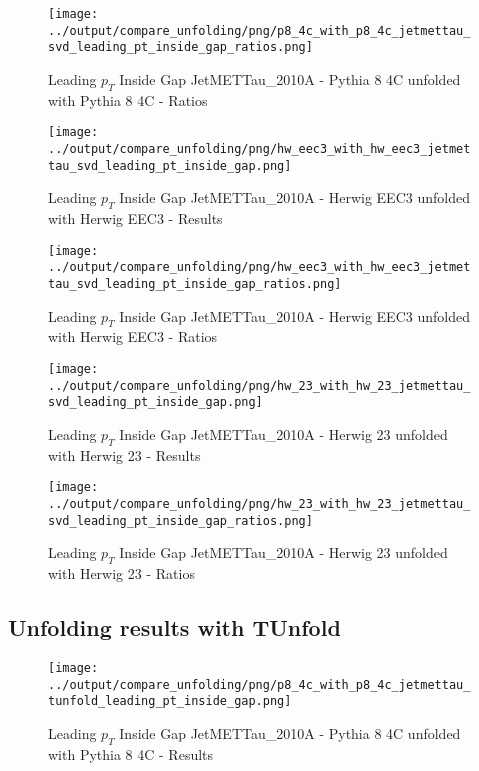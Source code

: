\documentclass[11pt]{book}
\begin{document}
\begin{figure}[ht]
\centering
\texttt{[image: ../output/compare\_unfolding/png/p8\_4c\_with\_p8\_4c\_jetmettau\_svd\_leading\_pt\_inside\_gap\_ratios.png]}
\caption{Leading $p_{T}$ Inside Gap JetMETTau\_2010A - Pythia 8 4C unfolded with Pythia 8 4C - Ratios}
\label{p8_p8_jetmettau_svd_leading_pt_inside_gap_b}
\end{figure}

\begin{figure}[ht]
\centering
\texttt{[image: ../output/compare\_unfolding/png/hw\_eec3\_with\_hw\_eec3\_jetmettau\_svd\_leading\_pt\_inside\_gap.png]}
\caption{Leading $p_{T}$ Inside Gap JetMETTau\_2010A - Herwig EEC3 unfolded with Herwig EEC3 - Results}
\label{hw_eec3_hw_eec3_jetmettau_svd_leading_pt_inside_gap_a}
\end{figure}

\begin{figure}[ht]
\centering
\texttt{[image: ../output/compare\_unfolding/png/hw\_eec3\_with\_hw\_eec3\_jetmettau\_svd\_leading\_pt\_inside\_gap\_ratios.png]}
\caption{Leading $p_{T}$ Inside Gap JetMETTau\_2010A - Herwig EEC3 unfolded with Herwig EEC3 - Ratios}
\label{hw_eec3_hw_eec3_jetmettau_svd_leading_pt_inside_gap_b}
\end{figure}

\begin{figure}[ht]
\centering
\texttt{[image: ../output/compare\_unfolding/png/hw\_23\_with\_hw\_23\_jetmettau\_svd\_leading\_pt\_inside\_gap.png]}
\caption{Leading $p_{T}$ Inside Gap JetMETTau\_2010A - Herwig 23 unfolded with Herwig 23 - Results}
\label{hw_23_hw_23_jetmettau_svd_leading_pt_inside_gap_a}
\end{figure}

\begin{figure}[ht]
\centering
\texttt{[image: ../output/compare\_unfolding/png/hw\_23\_with\_hw\_23\_jetmettau\_svd\_leading\_pt\_inside\_gap\_ratios.png]}
\caption{Leading $p_{T}$ Inside Gap JetMETTau\_2010A - Herwig 23 unfolded with Herwig 23 - Ratios}
\label{hw_23_hw_23_jetmettau_svd_leading_pt_inside_gap_b}
\end{figure}


\clearpage
\subsection{Unfolding results with TUnfold}

\begin{figure}[ht]
\centering
\texttt{[image: ../output/compare\_unfolding/png/p8\_4c\_with\_p8\_4c\_jetmettau\_tunfold\_leading\_pt\_inside\_gap.png]}
\caption{Leading $p_{T}$ Inside Gap JetMETTau\_2010A - Pythia 8 4C unfolded with Pythia 8 4C - Results}
\label{p8_p8_jetmettau_tunfold_leading_pt_inside_gap_a}
\end{figure}
\end{document}

